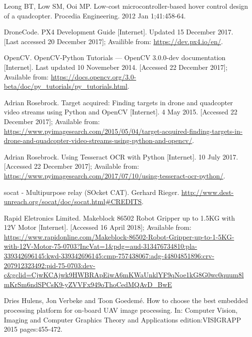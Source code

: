 \documentclass[11pt]{article}
\begin{document}
\begin{thebibliography}{11}
    Leong BT, Low SM, Ooi MP. Low-cost microcontroller-based hover control design of a quadcopter. Procedia Engineering. 2012 Jan 1;41:458-64.

    DroneCode. PX4 Development Guide [Internet]. Updated 15 December 2017. [Last accessed 20 December 2017]; Availible from: \url{https://dev.px4.io/en/}.

    OpenCV. OpenCV-Python Tutorials — OpenCV 3.0.0-dev documentation [Internet]. Last updated 10 Novemeber 2014. [Accessed 22 December 2017]; Available from: \url{https://docs.opencv.org/3.0-beta/doc/py_tutorials/py_tutorials.html}.

    Adrian Rosebrock. Target acquired: Finding targets in drone and quadcopter video streams using Python and OpenCV [Internet]. 4 May 2015. [Accessed 22 December 2017]; Available from: \url{https://www.pyimagesearch.com/2015/05/04/target-acquired-finding-targets-in-drone-and-quadcopter-video-streams-using-python-and-opencv/}.

    Adrian Rosebrock. Using Tesseract OCR with Python [Internet]. 10 July 2017. [Accessed 22 December 2017]; Available from: \url{https://www.pyimagesearch.com/2017/07/10/using-tesseract-ocr-python/}.

    socat - Multipurpose relay (SOcket CAT). Gerhard Rieger. \url{http://www.dest-unreach.org/socat/doc/socat.html#CREDITS}.

    Rapid Eletronics Limited. Makeblock 86502 Robot Gripper up to 1.5KG with 12V Motor [Internet]. [Accessed 16 April 2018]; Available from: \url{https://www.rapidonline.com/Makeblock-86502-Robot-Gripper-up-to-1-5KG-with-12V-Motor-75-0703?IncVat=1&pdg=aud-313476734810:pla-339342696145:kwd-339342696145:cmp-757438067:adg-44804851896:crv-207912323492:pid-75-0703:dev-c&gclid=CjwKCAjwk9HWBRApEiwA6mKWaUnklYF9qNoe1kG8G0wc0quum8lmKrSm6ndSPCsK9-yZVVFx949oThoCedMQAvD_BwE}

    Dries Hulens, Jon Verbeke and Toon Goedem\'e. How to choose the best embedded processing platform for on-board UAV image processing. In: Computer Vision, Imaging and Computer Graphics Theory and Applications edition:VISIGRAPP 2015 pages:455-472.

\end{thebibliography}
\end{document}
